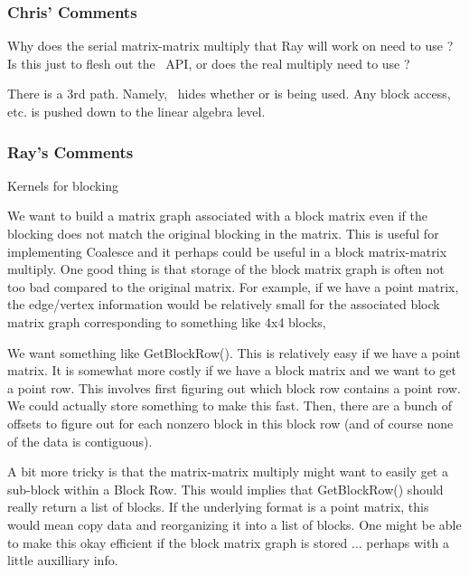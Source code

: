 \subsubsection{Chris' Comments}

\be
 \item Why does the serial matrix-matrix multiply that Ray will work on need to use \cthulhu?  Is this just to flesh out the \cthulhu\ API, or does the real
 multiply need to use \cthulhu?
 \item There is a 3rd path.  Namely, \cthulhu\ hides whether \Epetra or \Tpetra is being used.  Any block access, etc. is pushed down to the linear algebra
 level.  
\ee

\subsubsection{Ray's Comments}
Kernels for blocking

\be
\item We want to build a matrix graph associated with a block matrix even if
   the blocking does not match the original blocking in the matrix. This
   is useful for implementing Coalesce and it perhaps could be useful
   in a block matrix-matrix multiply. One good thing is that storage of
   the block matrix graph is often not too bad compared to the original
   matrix. For example, if we have a point matrix, the edge/vertex information
   would be relatively small for the associated block matrix graph 
   corresponding to something like 4x4 blocks, 

\item We want something like GetBlockRow(). This is relatively easy if we have
   a point matrix. It is somewhat more costly if we have a block matrix
   and we want to get a point row. This involves first figuring out which
   block row contains a point row. We could actually store something to
   make this fast. Then, there are a bunch of offsets to figure out 
   for each nonzero block in this block row (and of course none of the
   data is contiguous).

\item A bit more tricky is that the matrix-matrix multiply might want to
   easily get a sub-block within a Block Row. This would implies that
   GetBlockRow() should really return a list of blocks. If the underlying
   format is a point matrix, this would mean copy data and reorganizing
   it into a list of blocks. One might be able to make this okay efficient
   if the block matrix graph is stored ... perhaps with a little auxilliary
   info.

